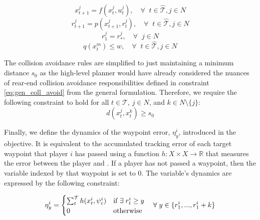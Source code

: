\begin{equation} \label{eq:ll_dyn}
    x^j_{t+1} = f(x^j_{t}, u^j_t), \quad \forall \;\; t \in \hat{\mathcal{T}}, j \in N
\end{equation}
\begin{equation} \label{eq::ll_pos}
    r^j_{t+1} = p(x^j_{t+1}, r^j_t), \quad \forall \;\; t \in \hat{\mathcal{T}}, j \in N
\end{equation}
\begin{equation} \label{eq::ll_pos_init}
    r^j_{1} = r^j_*, \quad \forall\;\; j \in N
\end{equation}
\begin{equation} \label{eq:ll_pos_dist}
    q(x^m_{t}) \leq w, \quad \forall \;\; t \in \hat{\mathcal{T}}, j \in N
\end{equation}

The collision avoidance rules are simplified to just maintaining a minimum distance $s_0$ as the high-level planner would have already considered the nuances of rear-end collision avoidance responsibilities defined in constraint \eqref{eq:gen_coll_avoid} from the general formulation. Therefore, we require the following constraint to hold for all $t \in \mathcal{T}$, $j \in N$, and $k \in N \setminus \{j\}$:
\begin{equation} \label{eq:ll_coll_avoid}
    d(x^j_{t}, x^k_t) \geq s_0
\end{equation}

Finally, we define the dynamics of the waypoint error, $\eta^i_y$, introduced in the objective. It is equivalent to the accumulated tracking error of each target waypoint that player $i$ has passed using a function $h: X\times X \rightarrow \mathbb{R}$ that measures the error between the player and . If a player has not passed a waypoint, then the variable indexed by that waypoint is set to 0. The variable's dynamics are expressed by the following constraint:

\begin{equation} \label{eq:ll_wp_err}
    \eta^i_y = \begin{cases} \sum_{t}^{\Hat{\mathcal{T}}} h(x^i_t, \psi^i_{c})  & \text{if } \exists \; r^i_t \geq y \\
    0 & \text{otherwise}
    \end{cases} 
    \quad \forall \; y \in \{r^i_{1}, ..., r^i_{1} + k\}
\end{equation}

